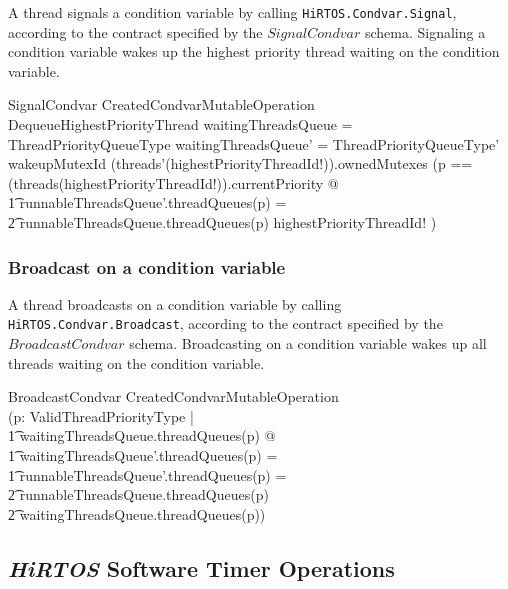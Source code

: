 \documentclass[11pt,letterpaper,twoside,openany]{book}
\begin{document}
A thread signals a condition variable by calling \verb`HiRTOS.Condvar.Signal`, according to the contract
specified by the $SignalCondvar$ schema.
Signaling a condition variable wakes up the highest priority thread waiting on the
condition variable.

\begin{schema}{SignalCondvar}
   CreatedCondvarMutableOperation \\
   DequeueHighestPriorityThread
\where
   waitingThreadsQueue = \theta ThreadPriorityQueueType
\also
   waitingThreadsQueue' = \theta ThreadPriorityQueueType'
\also
   wakeupMutexId \in \ran (threads'(highestPriorityThreadId!)).ownedMutexes
\also
   (\LET p == (threads(highestPriorityThreadId!)).currentPriority @ \\
   \t1 runnableThreadsQueue'.threadQueues(p) = \\
   \t2 runnableThreadsQueue.threadQueues(p) \cat \langle highestPriorityThreadId! \rangle)
\end{schema}

\subsubsection{Broadcast on a condition variable}

A thread broadcasts on a condition variable by calling \verb`HiRTOS.Condvar.Broadcast`, according to the contract
specified by the $BroadcastCondvar$ schema.
Broadcasting on a condition variable wakes up all threads waiting on the condition variable.

\begin{schema}{BroadcastCondvar}
   CreatedCondvarMutableOperation \\
\where
   (\forall p: ValidThreadPriorityType | \\
   \t1     waitingThreadsQueue.threadQueues(p) \neq \emptyset @ \\
   \t1     waitingThreadsQueue'.threadQueues(p) = \emptyset \land \\
   \t1     runnableThreadsQueue'.threadQueues(p) = \\
   \t2     runnableThreadsQueue.threadQueues(p) \cat \\
   \t2     waitingThreadsQueue.threadQueues(p))
\end{schema}

\subsection{\emph{HiRTOS} Software Timer Operations}
\end{document}

